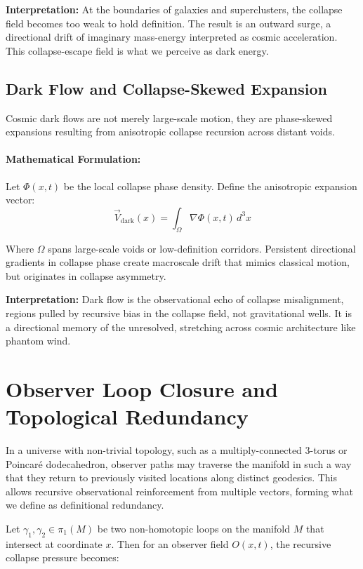 \textbf{Interpretation:} At the boundaries of galaxies and superclusters, the collapse field becomes too weak to hold definition. The result is an outward surge, a directional drift of imaginary mass-energy interpreted as cosmic acceleration. This collapse-escape field is what we perceive as dark energy.

\subsection{Dark Flow and Collapse-Skewed Expansion}\cite{topology_geometry_core}
Cosmic dark flows are not merely large-scale motion, they are phase-skewed expansions resulting from anisotropic collapse recursion across distant voids.

\paragraph{Mathematical Formulation:}
Let $\Phi(x,t)$ be the local collapse phase density. Define the anisotropic expansion vector:
\begin{equation}
\vec{V}_{\text{dark}}(x) = \int_{\Omega} \nabla \Phi(x,t) \, d^3x
\end{equation}

Where $\Omega$ spans large-scale voids or low-definition corridors. Persistent directional gradients in collapse phase create macroscale drift that mimics classical motion, but originates in collapse asymmetry.

\textbf{Interpretation:} Dark flow is the observational echo of collapse misalignment, regions pulled by recursive bias in the collapse field, not gravitational wells. It is a directional memory of the unresolved, stretching across cosmic architecture like phantom wind.

\section{Observer Loop Closure and Topological Redundancy}

In a universe with non-trivial topology, such as a multiply-connected 3-torus or Poincaré dodecahedron, observer paths may traverse the manifold in such a way that they return to previously visited locations along distinct geodesics\cite{roukema2004shape}. This allows recursive observational reinforcement from multiple vectors, forming what we define as definitional redundancy.

Let \( \gamma_1, \gamma_2 \in \pi_1(M) \) be two non-homotopic loops on the manifold \( M \) that intersect at coordinate \( x \). Then for an observer field \( O(x,t) \), the recursive collapse pressure becomes:

